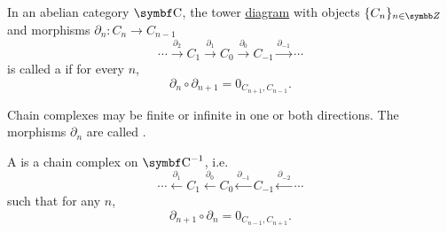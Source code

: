 \begin{definition}\label{def:chain_complex}\cite{nLab:chain_complex}
  In an abelian category \( \Cat{C} \), the tower \hyperref[def:tower_diagram]{diagram} with objects \( \{ C_n \}_{n \in \BZ} \) and morphisms \( \partial_n: C_n \to C_{n-1} \)
  \begin{equation}\label{def:chain_complex/chain_diagram}
    \cdots
    \overset {\partial_2} \longrightarrow
    C_1
    \overset {\partial_1} \longrightarrow
    C_0
    \overset {\partial_0} \longrightarrow
    C_{-1}
    \overset {\partial_{-1}} \longrightarrow
    \cdots
  \end{equation}
  is called a  if for every \( n \),
  \begin{equation*}
    \partial_n \circ \partial_{n+1} = 0_{C_{n+1},C_{n-1}}.
  \end{equation*}

  Chain complexes may be finite or infinite in one or both directions. The morphisms \( \partial_n \) are called .

  A  is a chain complex on \( \Cat{C}^{-1} \), i.e.
  \begin{equation}\label{def:chain_complex/cochain_diagram}
    \cdots
    \overset {\partial_1} \longleftarrow
    C_1
    \overset {\partial_0} \longleftarrow
    C_0
    \overset {\partial_{-1}} \longleftarrow
    C_{-1}
    \overset {\partial_{-2}} \longleftarrow
    \cdots
  \end{equation}
  such that for any \( n \),
  \begin{equation*}
    \partial_{n+1} \circ \partial_n = 0_{C_{n-1},C_{n+1}}.
  \end{equation*}
\end{definition}
